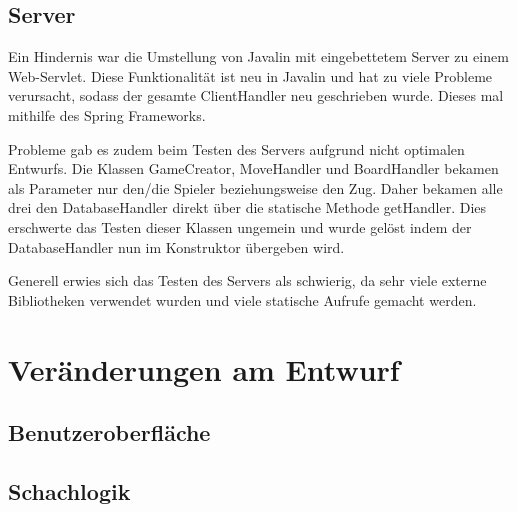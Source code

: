 \documentclass[parskip=full]{scrartcl}
\begin{document}
		
		
		
		\subsection{Server}
		Ein Hindernis war die Umstellung von Javalin mit eingebettetem Server zu einem Web-Servlet. Diese Funktionalität ist neu in Javalin und hat zu viele Probleme verursacht, sodass der gesamte ClientHandler neu geschrieben wurde.
		Dieses mal mithilfe des Spring Frameworks.	
		
		Probleme gab es zudem beim Testen des Servers aufgrund nicht optimalen Entwurfs.
		Die Klassen GameCreator, MoveHandler und BoardHandler bekamen als Parameter nur den/die Spieler beziehungsweise den Zug. Daher bekamen alle drei den DatabaseHandler direkt über die statische Methode getHandler. Dies erschwerte das Testen dieser Klassen ungemein und wurde gelöst indem der DatabaseHandler nun im Konstruktor übergeben wird.
		
		Generell erwies sich das Testen des Servers als schwierig, da sehr viele externe Bibliotheken verwendet wurden und viele statische Aufrufe gemacht werden.
		\section{Veränderungen am Entwurf}
		
		\subsection{Benutzeroberfläche}	
			
		\subsection{Schachlogik}
		
\end{document}
